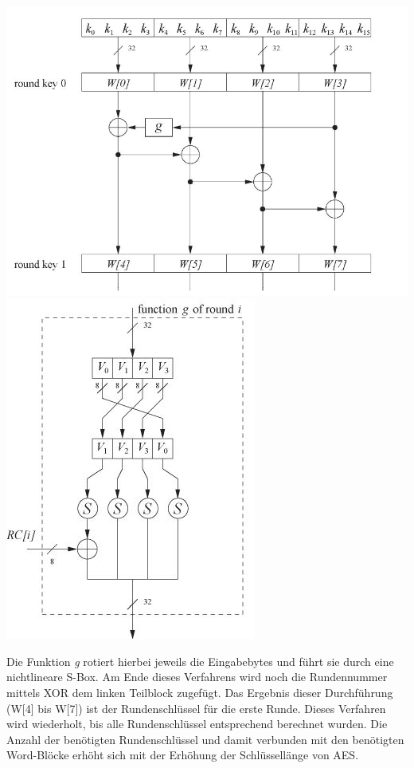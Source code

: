 \documentclass[10pt, a4paper,headsepline,pointednumbers]{scrreprt}
\begin{document}
\includegraphics[scale=0.4]{key_sched_1_round.JPG} 
\includegraphics[scale=0.55]{aes_key_sched_function_g.JPG}
\hfill

Die Funktion \textit{g} rotiert hierbei jeweils die Eingabebytes und führt sie durch eine nichtlineare S-Box. Am Ende dieses Verfahrens wird noch die Rundennummer mittels XOR dem linken Teilblock zugefügt. Das Ergebnis dieser Durchführung (W[4] bis W[7]) ist der Rundenschlüssel für die erste Runde. Dieses Verfahren wird wiederholt, bis alle Rundenschlüssel entsprechend berechnet wurden. Die Anzahl der benötigten Rundenschlüssel und damit verbunden mit den benötigten Word-Blöcke erhöht sich mit der Erhöhung der Schlüssellänge von AES.
\end{document}
